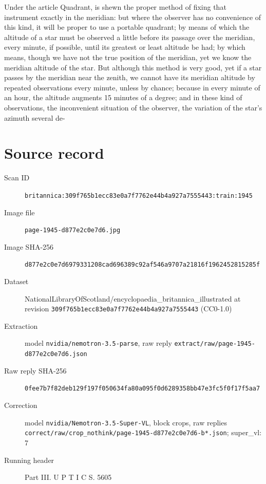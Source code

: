 \documentclass{article}
\begin{document}
Under the article Quadrant, is shewn the proper method of fixing that instrument exactly in the meridian: but where the observer has no convenience of this kind, it will be proper to use a portable quadrant; by means of which the altitude of a star must be observed a little before its passage over the meridian, every minute, if possible, until its greatest or least altitude be had; by which means, though we have not the true position of the meridian, yet we know the meridian altitude of the star. But although this method is very good, yet if a star passes by the meridian near the zenith, we cannot have its meridian altitude by repeated observations every minute, unless by chance; because in every minute of an hour, the altitude augments 15 minutes of a degree; and in these kind of observations, the inconvenient situation of the observer, the variation of the star's azimuth several de-


\section*{Source record}
\begin{description}
\item[Scan ID] \texttt{britannica:309f765b1ecc83e0a7f7762e44b4a927a7555443:train:1945}
\item[Image file] \texttt{page-1945-d877e2c0e7d6.jpg}
\item[Image SHA-256] \texttt{d877e2c0e7d6979331208cad696389c92af546a9707a21816f1962452815285f}
\item[Dataset] NationalLibraryOfScotland/encyclopaedia\_britannica\_illustrated at revision \texttt{309f765b1ecc83e0a7f7762e44b4a927a7555443} (CC0-1.0)
\item[Extraction] model \texttt{nvidia/nemotron-3.5-parse}, raw reply \texttt{extract/raw/page-1945-d877e2c0e7d6.json}
\item[Raw reply SHA-256] \texttt{0fee7b7f82deb129f197f050634fa80a095f0d6289358bb47e3fc5f0f17f5aa7}
\item[Correction] model \texttt{nvidia/Nemotron-3.5-Super-VL}, block crops, raw replies \texttt{correct/raw/crop\_nothink/page-1945-d877e2c0e7d6-b*.json}; super\_vl: 7
\item[Running header] Part III. U P T I C S. 5605
\end{description}
\end{document}
